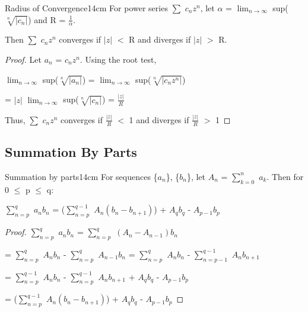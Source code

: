     \begin{wtheorem}{Radius of Convergence}{14cm}
        For power series $\sum$ $c_n z^n$, let
        $\alpha$ = $\lim_{n \rightarrow \infty}$ sup($\sqrt[n]{|c_n|}$)
        and R = $\frac{1}{\alpha}$.

        Then $\sum$ $c_n z^n$ converges if $|z|$ $<$ R and
        diverges if $|z|$ $>$ R.
    \end{wtheorem}

    \begin{proof}
        Let $a_n$ = $c_n z^n$. Using the {\color{red} root test},

        \hspace{1cm}
        $\lim_{n \rightarrow \infty}$ sup($\sqrt[n]{|a_n|}$)
        = $\lim_{n \rightarrow \infty}$ sup($\sqrt[n]{|c_n z^n|}$)

        \hspace{4.7cm}
        = $|z|$ $\lim_{n \rightarrow \infty}$ sup($\sqrt[n]{|c_n|}$)
        = $\frac{|z|}{R}$

        Thus, $\sum$ $c_n z^n$ converges if $\frac{|z|}{R}$ $<$ 1
        and diverges if $\frac{|z|}{R}$ $>$ 1
    \end{proof}

    \vspace{0.5cm}





\subsection{ Summation By Parts }

    \begin{wtheorem}{Summation by parts}{14cm}
        For sequences \{$a_n$\}, \{$b_n$\}, let $A_n$ = $\sum_{k=0}^n$ $a_k$.
        Then for 0 $\leq$ p $\leq$ q:

        \hspace{1cm}
        $\sum_{n = p}^q$ $a_n b_n$
        = ($\sum_{n = p}^{q-1}$ $A_n (b_n - b_{n+1})$)
        + $A_q b_q$ - $A_{p-1} b_p$
    \end{wtheorem}

    \begin{proof}
        $\sum_{n = p}^q$ $a_n b_n$
        = $\sum_{n = p}^q$ $(A_n - A_{n-1}) b_n$

        \hspace{2cm}
        = $\sum_{n = p}^q$ $A_n b_n$ - $\sum_{n = p}^q$ $A_{n-1} b_n$
        = $\sum_{n = p}^q$ $A_n b_n$ - $\sum_{n = p-1}^{q-1}$ $A_{n} b_{n+1}$

        \hspace{2cm}
        = $\sum_{n = p}^{q-1}$ $A_n b_n$ - $\sum_{n = p}^{q-1}$ $A_{n} b_{n+1}$
        + $A_q b_q$ - $A_{p-1} b_p$

        \hspace{2cm}
        = ($\sum_{n = p}^{q-1}$ $A_n (b_n - b_{n+1})$)
        + $A_q b_q$ - $A_{p-1} b_p$
    \end{proof}

